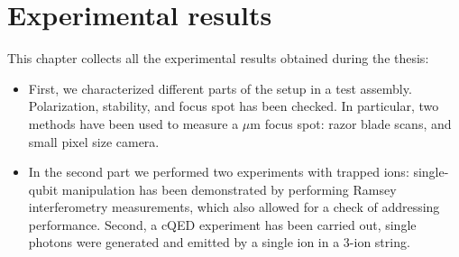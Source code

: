 
\chapter{Experimental results}
This chapter collects all the experimental results obtained during the thesis:
\begin{itemize}
\item First, we characterized different parts of the setup in a test assembly. Polarization, stability, and focus spot has been checked. In particular, two methods have been used to measure a $\mu$m focus spot: razor blade scans, and small pixel size camera.
\item In the second part we performed two experiments with trapped ions: single-qubit manipulation has been demonstrated by performing Ramsey interferometry measurements, which also allowed for a check of addressing performance. Second, a cQED experiment has been carried out, single photons were generated and emitted by a single ion in a 3-ion string.
\end{itemize}
